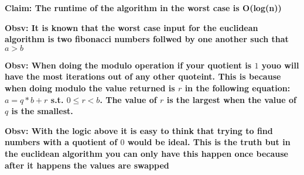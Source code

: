 \documentclass[addpoints]{exam}
\renewcommand{\gcd}{\textsc{Gcd}}
\begin{document}
\begin{questions}


\textbf{Claim: The runtime of the algorithm in the worst case is O(log(n))}

\textbf{Obsv: It is known that the worst case input for the euclidean algorithm is two fibonacci numbers follwed by one another such that $a > b$}

\textbf{Obsv: When doing the modulo operation if your quotient is $1$ youo will have the most iterations out of any other quoteint. This is because when doing modulo the value returned is $r$ in the following equation: $a = q * b + r$ s.t. $0 \le r < b$. The value of $r$ is the largest when the value of $q$ is the smallest.}

\textbf{Obsv: With the logic above it is easy to think that trying to find numbers with a quotient of $0$ would be ideal. This is the truth but in the euclidean algorithm you can only have this happen once because after it happens the values are swapped}


\end{questions}
\end{document}
